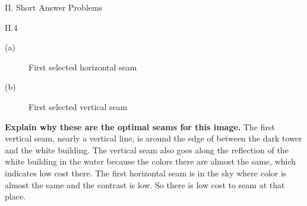 \documentclass[a4paper,12pt]{article}
\begin{document}
\begin{section}{II. Short Answer Problems}
\begin{subsection}{II.4}
      
\begin{subsubsection}{(a)}
\begin{figure}[!htb]
        \caption{First selected horizontal seam}
      \end{figure}
      \clearpage
\end{subsubsection}
      \begin{subsubsection}{(b)}
      \begin{figure}[!htb]
        \caption{First selected vertical seam}
      \end{figure}
	\end{subsubsection}
	      \clearpage
\textbf{Explain why these are the optimal seams for this image.}
The first vertical seam, nearly a vertical line, is around the edge of between the dark tower and the white building. The vertical seam also goes along the reflection of the white building in the water because the colors there are almost the same, which indicates low cost there. 
The first horizontal seam is in the sky where color is almost the same and the contrast is low. So there is low cost to seam at that place.



\end{subsection}
\end{section}
\end{document}
